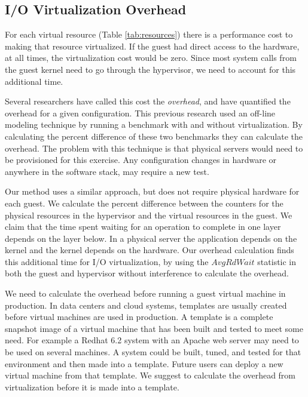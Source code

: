 \subsection{I/O Virtualization Overhead}
For each virtual resource (Table \ref{tab:resources}) there is a performance cost to making that resource virtualized.  If the guest had direct access to the hardware, at all times, the virtualization cost would be zero.  Since most system calls from the guest kernel need to go through the hypervisor, we need to account for this additional time.

Several researchers \cite{cherkasova, huber1} have called this cost the \emph{overhead}, and have quantified the overhead for a given configuration.  This previous research used an off-line modeling technique by running a benchmark with and without virtualization.  By calculating the percent difference of these two benchmarks they can calculate the overhead.
The problem with this technique is that physical servers would need to be provisioned for this exercise.  Any configuration changes in hardware or anywhere in the software stack, may require a new test.  

Our method uses a similar approach, but does not require physical hardware for each guest.  We calculate the percent difference between the counters for the physical resources in the hypervisor and the virtual resources in the guest. 
We claim that the time spent waiting for an operation to complete in one layer depends on the layer below.  
In a physical server the application depends on the kernel and the kernel depends on the hardware.  
Our overhead calculation finds this additional time for I/O virtualization, by using the $AvgRdWait$ statistic in both the guest and hypervisor without interference to calculate the overhead.

We need to calculate the overhead before running a guest virtual machine in production. 
In data centers and cloud systems, templates are usually created before virtual machines are used in production.  A template is a complete snapshot image of a virtual machine that has been built and tested to meet some need.  For example a Redhat 6.2 system with an Apache web server may need to be used on several machines.  A system could be built, tuned, and tested for that environment and then made into a template.  Future users can deploy a new virtual machine from that template.  We suggest to calculate the overhead from virtualization before it is made into a template.  

